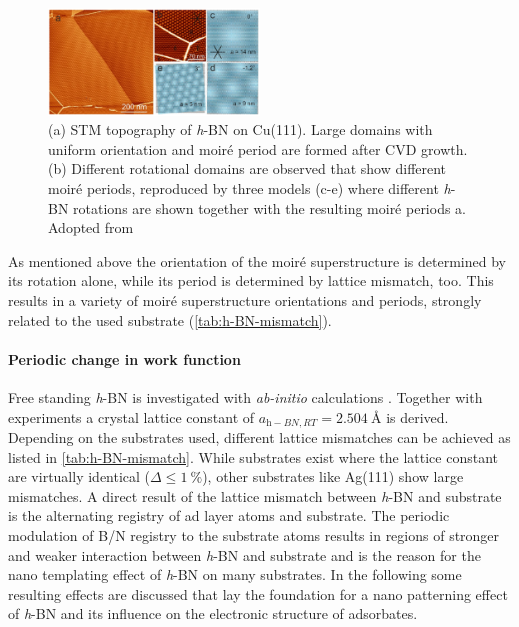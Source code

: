 \begin{figure} \centering
	\includegraphics[width=0.5\textwidth]{./images/h-BN-cvd-cu111.png}%
\caption{(a) STM topography of \textit{h}-BN on Cu(111). Large domains with uniform orientation and moir\'e period are formed after CVD growth. (b) Different rotational domains are observed that show different moir\'e periods, reproduced by three models (c-e) where different \textit{h}-BN rotations are shown together with the resulting moir\'e periods a. Adopted from \cite{joshi_boron_2012}}
\label{fig:moire-STM-model}
\end{figure}

As mentioned above the orientation of the moir\'e superstructure is determined by its rotation alone, while its period is determined by lattice mismatch, too. This results in a variety of moir\'e superstructure orientations and periods, strongly related to the used substrate (\autoref{tab:h-BN-mismatch}).

	
\paragraph{Periodic change in work function}
Free standing \textit{h}-BN is investigated with \textit{ab-initio} calculations \cite{han_effects_2014,mortazavi_investigation_2012,topsakal_first-principles_2009,peng_mechanical_2012}. Together with experiments \cite{paszkowicz_lattice_2002} a crystal lattice constant of $a_{\textit{h}-BN, RT}=\SI{2.504}{\angstrom}$ is derived. Depending on the substrates used, different lattice mismatches can be achieved as listed in \autoref{tab:h-BN-mismatch}. While substrates exist where the lattice constant are virtually identical ($\Delta \leq \SI{1}{\percent}$), other substrates like Ag(111) show large mismatches. A direct result of the lattice mismatch between \textit{h}-BN and substrate is the alternating registry of ad layer atoms and substrate. The periodic modulation of B/N registry to the substrate atoms results in regions of stronger and weaker interaction between \textit{h}-BN and substrate and is the reason for the nano templating effect of \textit{h}-BN on many substrates. In the following some resulting effects are discussed that lay the foundation for a nano patterning effect of \textit{h}-BN and its influence on the electronic structure of adsorbates.

